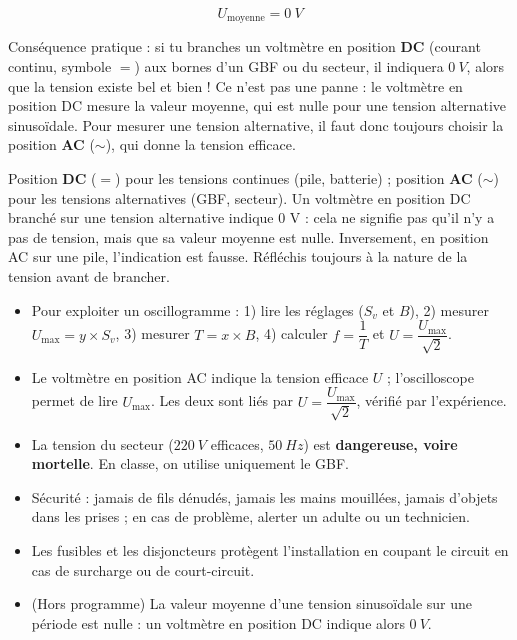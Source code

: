 \documentclass[11pt]{article}
\begin{document}
\[ U_{\text{moyenne}} = \SI{0}{V} \]

Conséquence pratique : si tu branches un voltmètre en position \textbf{DC} (courant continu, symbole $=$) aux bornes d'un GBF ou du secteur, il indiquera $\SI{0}{V}$, alors que la tension existe bel et bien ! Ce n'est pas une panne : le voltmètre en position DC mesure la valeur moyenne, qui est nulle pour une tension alternative sinusoïdale. Pour mesurer une tension alternative, il faut donc toujours choisir la position \textbf{AC} ($\sim$), qui donne la tension efficace.

\begin{attention}
Position \textbf{DC} ($=$) pour les tensions continues (pile, batterie) ; position \textbf{AC} ($\sim$) pour les tensions alternatives (GBF, secteur). Un voltmètre en position DC branché sur une tension alternative indique $0$ V : cela ne signifie pas qu'il n'y a pas de tension, mais que sa valeur moyenne est nulle. Inversement, en position AC sur une pile, l'indication est fausse. Réfléchis toujours à la nature de la tension avant de brancher.
\end{attention}

\begin{aretenir}
\begin{itemize}
\item Pour exploiter un oscillogramme : 1) lire les réglages ($S_v$ et $B$), 2) mesurer $U_{\text{max}} = y \times S_v$, 3) mesurer $T = x \times B$, 4) calculer $f = \dfrac{1}{T}$ et $U = \dfrac{U_{\text{max}}}{\sqrt{2}}$.
\item Le voltmètre en position AC indique la tension efficace $U$ ; l'oscilloscope permet de lire $U_{\text{max}}$. Les deux sont liés par $U = \dfrac{U_{\text{max}}}{\sqrt{2}}$, vérifié par l'expérience.
\item La tension du secteur ($\SI{220}{V}$ efficaces, $\SI{50}{Hz}$) est \textbf{dangereuse, voire mortelle}. En classe, on utilise uniquement le GBF.
\item Sécurité : jamais de fils dénudés, jamais les mains mouillées, jamais d'objets dans les prises ; en cas de problème, alerter un adulte ou un technicien.
\item Les fusibles et les disjoncteurs protègent l'installation en coupant le circuit en cas de surcharge ou de court-circuit.
\item (Hors programme) La valeur moyenne d'une tension sinusoïdale sur une période est nulle : un voltmètre en position DC indique alors $\SI{0}{V}$.
\end{itemize}
\end{aretenir}
\end{document}
